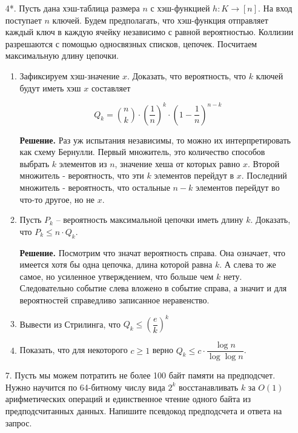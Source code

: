 \begin{enumerate}
	\item[4*.] Пусть дана хэш-таблица размера $n$ с хэш-функцией $h : K \rightarrow [n]$. На вход поступает $n$ 
	ключей. Будем предполагать, что хэш-функция отправляет каждый ключ в каждую ячейку независимо с равной 
	вероятностью. Коллизии разрешаются с помощью односвязных списков, цепочек. Посчитаем максимальную длину 
	цепочки.
	
	\begin{enumerate}
		\item Зафиксируем хэш-значение $x$. Доказать, что вероятность, что $k$ ключей будут иметь хэш $x$ 
		составляет
		
		\begin{equation*}
			Q_k = \binom{n}{k}\cdot \left( \frac{1}{n} \right)^k \cdot \left(1 - \frac{1}{n} \right)^{n-k}
		\end{equation*}
		
		\textbf{Решение.} Раз уж испытания независимы, то можно их интерпретировать как схему Бернулли. Первый 
		множитель, это количество способов выбрать $k$ элементов из $n$, значение хеша от которых равно $x$. 
		Второй множитель - вероятность, что эти $k$ элементов перейдут в $x$. Последний множитель - вероятность, 
		что остальные $n - k$ элементов перейдут во что-то другое, но не $x$.
		
		\item Пусть $P_k$ – вероятность максимальной цепочки иметь длину $k$. Доказать, что $P_k \leqslant n 
		\cdot Q_k$.
		
		\textbf{Решение.} Посмотрим что значат вероятность справа. Она означает, что имеется хотя бы одна 
		цепочка, длина которой равна $k$. А слева то же самое, но усиленное утверждением, что больше чем $k$ 
		нету. Следовательно событие слева вложено в событие справа, а значит и для вероятностей справедливо 
		записанное неравенство.
		
		\item Вывести из Стрилинга, что $Q_k \le \left(\dfrac{e}{k}\right)^k$
		\item Показать, что для некоторого $c \ge 1$ верно $Q_k \leqslant c \cdot \dfrac{\log n}{\log \log n}$.
	\end{enumerate}
	
	\item[7.] Пусть мы можем потратить не более 100 байт памяти на предподсчет. Нужно научится по 64-битному 
	числу вида $2^k$ восстанавливать $k$ за $O(1)$ арифметических операций и единственное
	чтение одного байта из предподсчитанных данных. Напишите псевдокод предподсчета и ответа на 
	запрос.
	

\end{enumerate}
